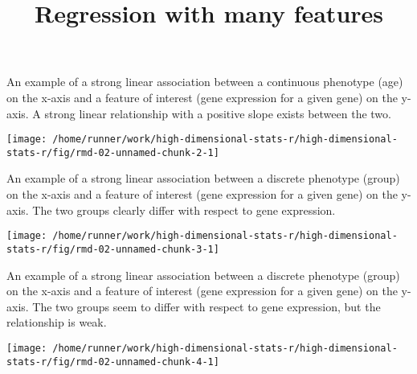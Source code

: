 \documentclass[ignorenonframetext,]{beamer}
\title{Regression with many features}
\author{}
\date{\vspace{-2.5em}}
\begin{document}
\frame{\titlepage}

\begin{frame}{An example of a strong linear association between a
continuous phenotype (age) on the x-axis and a feature of interest (gene
expression for a given gene) on the y-axis. A strong linear relationship
with a positive slope exists between the two.}
\protect\hypertarget{an-example-of-a-strong-linear-association-between-a-continuous-phenotype-age-on-the-x-axis-and-a-feature-of-interest-gene-expression-for-a-given-gene-on-the-y-axis.-a-strong-linear-relationship-with-a-positive-slope-exists-between-the-two.}{}

\texttt{[image: /home/runner/work/high-dimensional-stats-r/high-dimensional-stats-r/fig/rmd-02-unnamed-chunk-2-1]}



\end{frame}

\begin{frame}{An example of a strong linear association between a
discrete phenotype (group) on the x-axis and a feature of interest (gene
expression for a given gene) on the y-axis. The two groups clearly
differ with respect to gene expression.}
\protect\hypertarget{an-example-of-a-strong-linear-association-between-a-discrete-phenotype-group-on-the-x-axis-and-a-feature-of-interest-gene-expression-for-a-given-gene-on-the-y-axis.-the-two-groups-clearly-differ-with-respect-to-gene-expression.}{}

\texttt{[image: /home/runner/work/high-dimensional-stats-r/high-dimensional-stats-r/fig/rmd-02-unnamed-chunk-3-1]}



\end{frame}

\begin{frame}{An example of a strong linear association between a
discrete phenotype (group) on the x-axis and a feature of interest (gene
expression for a given gene) on the y-axis. The two groups seem to
differ with respect to gene expression, but the relationship is weak.}
\protect\hypertarget{an-example-of-a-strong-linear-association-between-a-discrete-phenotype-group-on-the-x-axis-and-a-feature-of-interest-gene-expression-for-a-given-gene-on-the-y-axis.-the-two-groups-seem-to-differ-with-respect-to-gene-expression-but-the-relationship-is-weak.}{}

\texttt{[image: /home/runner/work/high-dimensional-stats-r/high-dimensional-stats-r/fig/rmd-02-unnamed-chunk-4-1]}



\end{frame}
\end{document}

